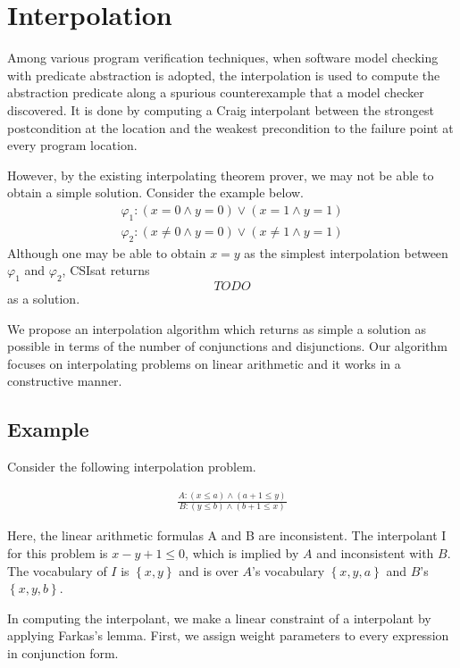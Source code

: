 \chapter{Interpolation}
\label{chap:interpolation}

Among various program verification techniques, when software model
checking with predicate abstraction is adopted, the interpolation is
used to compute the abstraction predicate along a spurious
counterexample that a model checker discovered.  It is done by
computing a Craig interpolant between the strongest postcondition at
the location and the weakest precondition to the failure point at
every program location.

However, by the existing interpolating theorem prover, we may not be
able to obtain a simple solution.  Consider the example below.
\begin{align*}
\varphi_1 : (x = 0 \wedge y = 0) \vee (x = 1 \wedge y = 1) \\
\varphi_2 : (x \neq 0 \wedge y = 0) \vee (x \neq 1 \wedge y = 1)
\end{align*}
Although one may be able to obtain $x = y$ as the simplest
interpolation between $\varphi_1$ and $\varphi_2$,
CSIsat\cite{conf/cav/BeyerZM08} returns
\[ TODO \]
as a solution.

We propose an interpolation algorithm which returns as simple a
solution as possible in terms of the number of conjunctions and
disjunctions.  Our algorithm focuses on interpolating problems on
linear arithmetic and it works in a constructive manner.


\section{Example}

Consider the following interpolation problem.

\begin{align*}
\frac
{A: (x \leq a) \wedge (a + 1 \leq y)}
{B: (y \leq b) \wedge (b + 1 \leq x)}
\end{align*}

Here, the linear arithmetic formulas A and B are inconsistent.  The
interpolant I for this problem is $x-y+1 \leq 0$, which is implied by
$A$ and inconsistent with $B$.  The vocabulary of $I$ is $\left\lbrace
x,y \right\rbrace$ and is over $A$'s vocabulary $\left\lbrace x,y,a
\right\rbrace$ and $B$'s $\left\lbrace x,y,b \right\rbrace$.

In computing the interpolant, we make a linear constraint of a
interpolant by applying Farkas's lemma.  First, we assign weight
parameters to every expression in conjunction form.

